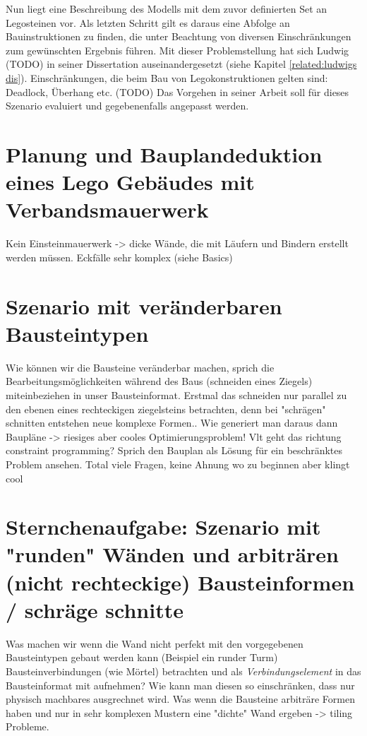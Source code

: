 Nun liegt eine Beschreibung des Modells mit dem zuvor definierten Set an Legosteinen vor.
Als letzten Schritt gilt es daraus eine Abfolge an Bauinstruktionen zu finden, die unter Beachtung von diversen Einschränkungen zum gewünschten Ergebnis führen.
Mit dieser Problemstellung hat sich Ludwig (TODO) in  seiner Dissertation auseinandergesetzt (siehe Kapitel \ref{related:ludwigs dis}). 
Einschränkungen, die beim Bau von Legokonstruktionen gelten sind:
Deadlock, Überhang etc. (TODO)
Das Vorgehen in seiner Arbeit soll für dieses Szenario evaluiert und gegebenenfalls angepasst werden.


\section{Planung und Bauplandeduktion eines Lego Gebäudes mit Verbandsmauerwerk}
Kein Einsteinmauerwerk -> dicke Wände, die mit Läufern und Bindern erstellt werden müssen.
Eckfälle sehr komplex (siehe Basics)

\section{Szenario mit veränderbaren Bausteintypen}
Wie können wir die Bausteine veränderbar machen, sprich die Bearbeitungsmöglichkeiten während des Baus (schneiden eines Ziegels) miteinbeziehen in unser Bausteinformat.
Erstmal das schneiden nur parallel zu den ebenen eines rechteckigen ziegelsteins betrachten, denn bei "schrägen" schnitten entstehen neue komplexe Formen..
Wie generiert man daraus dann Baupläne -> riesiges aber cooles Optimierungsproblem!
Vlt geht das richtung constraint programming? Sprich den Bauplan als Lösung für ein beschränktes Problem ansehen.
Total viele Fragen, keine Ahnung wo zu beginnen aber klingt cool

\section{Sternchenaufgabe: Szenario mit "runden" Wänden und arbiträren (nicht rechteckige) Bausteinformen / schräge schnitte}
Was machen wir wenn die Wand nicht perfekt mit den vorgegebenen Bausteintypen gebaut werden kann (Beispiel ein runder Turm)
Bausteinverbindungen (wie Mörtel) betrachten und als \textit{Verbindungselement} in das Bausteinformat mit aufnehmen? Wie kann man diesen so einschränken, dass nur physisch machbares ausgrechnet wird.
Was wenn die Bausteine arbiträre Formen haben und nur in sehr komplexen Mustern eine "dichte" Wand ergeben -> tiling Probleme.

